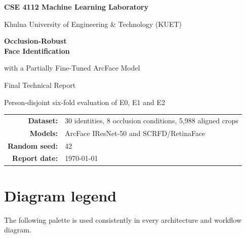 \documentclass[11pt,a4paper]{article}
\begin{document}
\hypersetup{pageanchor=false}

\begin{titlepage}
  \centering
  \vspace*{16mm}
  {\Large\bfseries\color{navy} CSE 4112 Machine Learning Laboratory\par}
  \vspace{4mm}
  {\large Khulna University of Engineering \& Technology (KUET)\par}
  \vspace{24mm}
  \begin{tcolorbox}[width=.92\textwidth,colback=softbg,colframe=navy,
    arc=5mm,boxrule=1.2pt,left=8mm,right=8mm,top=10mm,bottom=10mm,
    enhanced,drop fuzzy shadow]
    \centering
    {\Huge\bfseries\color{navy} Occlusion-Robust\\[2mm] Face Identification\par}
    \vspace{5mm}
    {\LARGE with a Partially Fine-Tuned ArcFace Model\par}
  \end{tcolorbox}
  \vspace{18mm}
  {\Large Final Technical Report\par}
  \vspace{7mm}
  {\large Person-disjoint six-fold evaluation of E0, E1 and E2\par}
  \vfill
  \begin{tabular}{rl}
    \textbf{Dataset:} & 30 identities, 8 occlusion conditions, 5,988 aligned crops\\
    \textbf{Models:} & ArcFace IResNet-50 and SCRFD/RetinaFace\\
    \textbf{Random seed:} & 42\\
    \textbf{Report date:} & \today
  \end{tabular}
  \vspace{12mm}
\end{titlepage}

\clearpage
\hypersetup{pageanchor=true}
\tableofcontents
\clearpage
\listoffigures
\clearpage

\section*{Diagram legend}
The following palette is used consistently in every architecture and workflow diagram.
\end{document}
